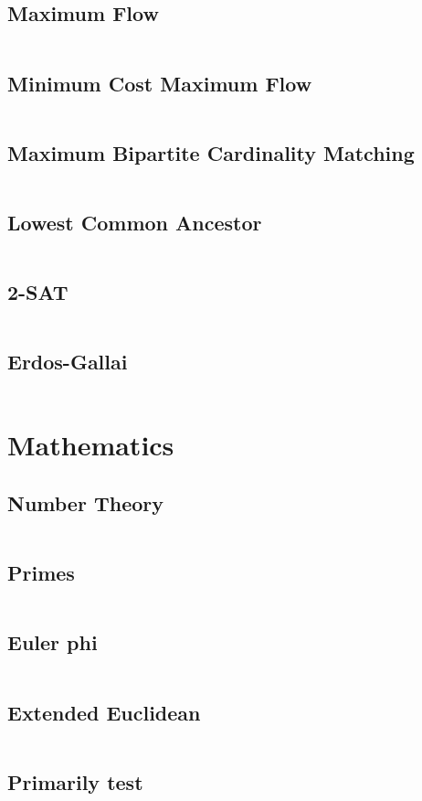 \documentclass[a4paper, 10pt, twocolumn, landscape]{article}
\begin{document}
\subsection{Maximum Flow}
\inputminted{cpp}{graphs/dinic.cpp} %
\subsection{Minimum Cost Maximum Flow}
\inputminted{cpp}{graphs/min-cost-max-flow.cpp} %
\subsection{Maximum Bipartite Cardinality Matching}
\inputminted{cpp}{graphs/kuhn.cpp}
\subsection{Lowest Common Ancestor}
\inputminted{cpp}{graphs/lca.cpp}
\subsection{2-SAT}
\inputminted{cpp}{graphs/2-sat.cpp}
\subsection{Erdos-Gallai}
\inputminted{cpp}{graphs/erdos-gallai.cpp}

\section{Mathematics}
\subsection{Number Theory}
\inputminted{cpp}{math/basics.cpp}
\subsection{Primes}
\inputminted{cpp}{math/sieve.cpp}
\subsection{Euler phi}
\inputminted{cpp}{math/euler-phi.cpp}
\subsection{Extended Euclidean}
\inputminted{cpp}{math/extended-euclid.cpp}
\subsection{Primarily test}
\inputminted{cpp}{math/miller-rabin.cpp}
\end{document}
